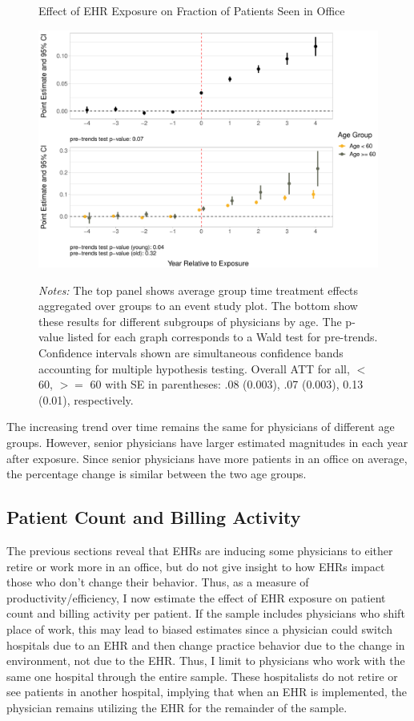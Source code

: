 \documentclass[12pt]{article}
\begin{document}
\begin{figure}[ht]
    \centering
    \captionsetup{width=.85\linewidth}
    \caption{Effect of EHR Exposure on Fraction of Patients Seen in Office}
    \includegraphics[scale=.6]{Objects/officefrac_plot.pdf}
    \label{fig:officesecond}
    \vspace{2mm}
    \caption*{\footnotesize{\textit{Notes:} The top panel shows average group time treatment effects aggregated over groups to an event study plot. The bottom show these results for different subgroups of physicians by age. The p-value listed for each graph corresponds to a Wald test for pre-trends. Confidence intervals shown are simultaneous confidence bands accounting for multiple hypothesis testing. Overall ATT for all, $<$ 60, $>=$ 60 with SE in parentheses: .08 (0.003), .07 (0.003), 0.13 (0.01), respectively.}}
\end{figure}

The increasing trend over time remains the same for physicians of different age groups. However, senior physicians have larger estimated magnitudes in each year after exposure. Since senior physicians have more patients in an office on average, the percentage change is similar between the two age groups. 



\subsection{Patient Count and Billing Activity}\label{sec:patientcount}

The previous sections reveal that EHRs are inducing some physicians to either retire or work more in an office, but do not give insight to how EHRs impact those who don't change their behavior. Thus, as a measure of productivity/efficiency, I now estimate the effect of EHR exposure on patient count and billing activity per patient. If the sample includes physicians who shift place of work, this may lead to biased estimates since a physician could switch hospitals due to an EHR and then change practice behavior due to the change in environment, not due to the EHR. Thus, I limit to physicians who work with the same one hospital through the entire sample. These hospitalists do not retire or see patients in another hospital, implying that when an EHR is implemented, the physician remains utilizing the EHR for the remainder of the sample. 
\end{document}
